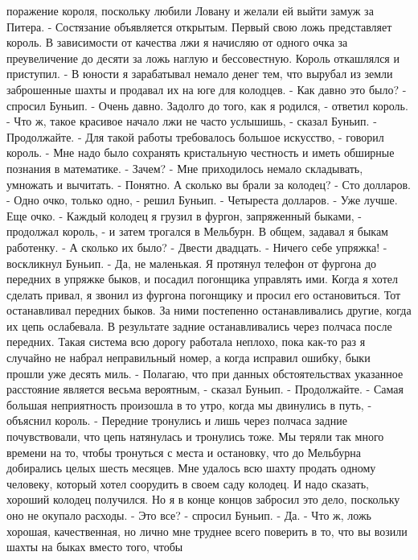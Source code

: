 поражение короля, поскольку любили Ловану и желали ей выйти замуж за 
Питера.
    - Состязание объявляется открытым. Первый свою ложь представляет 
король. В зависимости от качества лжи я начисляю от одного очка за 
преувеличение до десяти за ложь наглую и бессовестную.
    Король откашлялся и приступил.
    - В юности я зарабатывал немало денег тем, что вырубал из земли 
заброшенные шахты и продавал их на юге для колодцев.
    - Как давно это было? - спросил Буньип.
    - Очень давно. Задолго до того, как я родился, - ответил король.
    - Что ж, такое красивое начало лжи не часто услышишь, - сказал 
Буньип. - Продолжайте.
    - Для такой работы требовалось большое искусство, - говорил 
король. - Мне надо было сохранять кристальную честность и иметь 
обширные познания в математике.
    - Зачем?
    - Мне приходилось немало складывать, умножать и вычитать.
    - Понятно. А сколько вы брали за колодец?
    - Сто долларов.
    - Одно очко, только одно, - решил Буньип.
    - Четыреста долларов.
    - Уже лучше. Еще очко.
    - Каждый колодец я грузил в фургон, запряженный быками, - 
продолжал король, - и затем трогался в Мельбурн. В общем, задавал я 
быкам работенку.
    - А сколько их было?
    - Двести двадцать.
    - Ничего себе упряжка! - воскликнул Буньип.
    - Да, не маленькая. Я протянул телефон от фургона до передних в 
упряжке быков, и посадил погонщика управлять ими. Когда я хотел 
сделать привал, я звонил из фургона погонщику и просил его 
остановиться. Тот останавливал передних быков. За ними постепенно 
останавливались другие, когда их цепь ослабевала. В результате задние 
останавливались через полчаса после передних. Такая система всю дорогу 
работала неплохо, пока как-то раз я случайно не набрал неправильный 
номер, а когда исправил ошибку, быки прошли уже десять миль.
    - Полагаю, что при данных обстоятельствах указанное расстояние 
является весьма вероятным, - сказал Буньип. - Продолжайте.
    - Самая большая неприятность произошла в то утро, когда мы 
двинулись в путь, - объяснил король. - Передние тронулись и лишь через 
полчаса задние почувствовали, что цепь натянулась и тронулись тоже. Мы 
теряли так много времени на то, чтобы тронуться с места и остановку, 
что до Мельбурна добирались целых шесть месяцев. Мне удалось всю шахту 
продать одному человеку, который хотел соорудить в своем саду колодец. 
И надо сказать, хороший колодец получился. Но я в конце концов 
забросил это дело, поскольку оно не окупало расходы.
    - Это все? - спросил Буньип.
    - Да.
    - Что ж, ложь хорошая, качественная, но лично мне труднее всего 
поверить в то, что вы возили шахты на быках вместо того, чтобы 
